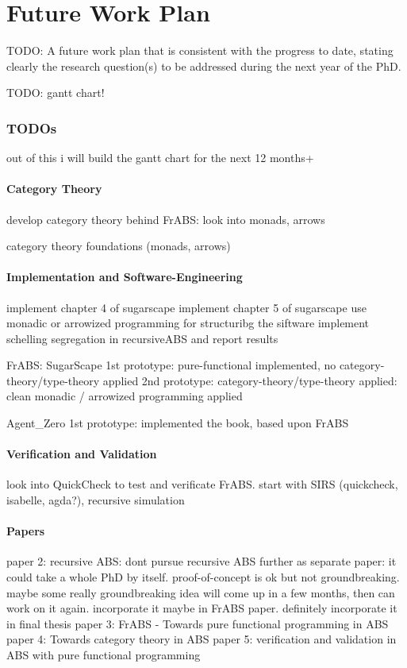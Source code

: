 \chapter{Future Work Plan}
TODO: A future work plan that is consistent with the progress to date, stating clearly the research question(s) to be addressed during the next year of the PhD.

TODO: gantt chart!

\subsection{TODOs}
out of this i will build the gantt chart for the next 12 months+

\subsubsection{Category Theory}
develop category theory behind FrABS: look into monads, arrows

category theory foundations (monads, arrows)

\subsubsection{Implementation and Software-Engineering}
implement chapter 4 of sugarscape
implement chapter 5 of sugarscape
use monadic or arrowized programming for structuribg the siftware
implement schelling segregation in recursiveABS and report results

FrABS: SugarScape
1st prototype: pure-functional implemented, no category-theory/type-theory applied
2nd prototype: category-theory/type-theory applied: clean monadic / arrowized programming applied

Agent\_Zero
1st prototype: implemented the book, based upon FrABS 

\subsubsection{Verification and Validation}
look into QuickCheck to test and verificate FrABS. start with SIRS
(quickcheck, isabelle, agda?), recursive simulation

\subsubsection{Papers}
paper 2: recursive ABS:  dont pursue recursive ABS further as separate paper: it could take a whole PhD by itself. proof-of-concept is ok but not groundbreaking. maybe some really groundbreaking idea will come up in a few months, then can work on it again. incorporate it maybe in FrABS paper. definitely incorporate it in final thesis
paper 3: FrABS - Towards pure functional programming in ABS
paper 4: Towards category theory in ABS
paper 5: verification and validation in ABS with pure functional programming


